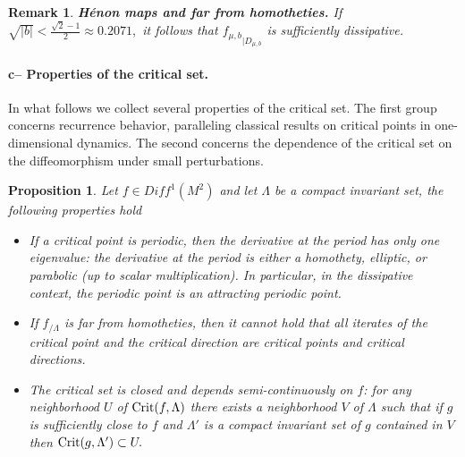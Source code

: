 \documentclass[a4paper,11pt]{article}
\newtheorem{proposition}[lemma]{Proposition}
\newtheorem{remark}[lemma]{Remark}
\theoremstyle{definition}
\def\La{\Lambda}
\def\La{\Lambda}
\begin{document}
\begin{remark}\label{Henon-FFH}{\bf H\'enon maps and far from homotheties. } If $\sqrt{|b|}< \frac{\sqrt2-1}{2}\approx 0.2071,$ it follows that ${f_{\mu,b}}_{|D_{\mu,b}}$ is sufficiently dissipative.
    
\end{remark}

 
\paragraph{c-- Properties of the critical set.} In what follows we collect several properties of the critical set. The first group concerns recurrence behavior, paralleling classical results on critical points in one-dimensional dynamics. The second concerns the dependence of the critical set on the diffeomorphism under small perturbations.



 

\begin{proposition}\label{properties}
Let $f\in Diff^1(M^2)$ and let $\La$ be a compact invariant set, the following properties hold
 \begin{itemize}





  
  \item[--] If a critical point is periodic, then the derivative at the period has only one eigenvalue: the derivative at the period is either a homothety, elliptic, or parabolic (up to scalar multiplication). In particular, in the dissipative context, the periodic point is an attracting periodic point.

\item[--]  If $f_{/\La}$  is far from homotheties, then it cannot hold that all iterates of the critical point and the critical direction  are  critical points and critical directions.


  

  
    \item[--] The critical set is closed and depends semi-continuously on $f$: for any  neighborhood $U$ of ${\rm Crit}(f,\Lambda)$ there exists a neighborhood $V$ of $\La$ such that if $g$ is sufficiently close to $f$ and $\La'$ is a compact invariant set of $g$ contained in $V$ then ${\rm Crit}(g,\Lambda') \subset U.$ 
  
   

   
  

    
 \end{itemize}





\end{proposition}
\end{document}
